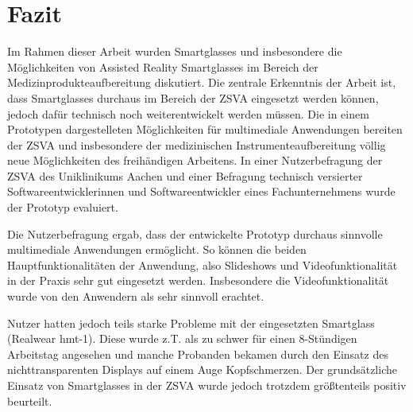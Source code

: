 %
%
%
%
%
%
\chapter{Fazit}
\label{ch:Fazit}

Im Rahmen dieser Arbeit wurden Smartglasses und insbesondere die Möglichkeiten von Assisted Reality Smartglasses im Bereich der Medizinprodukteaufbereitung diskutiert. Die zentrale Erkenntnis der Arbeit ist, dass Smartglasses durchaus im Bereich der ZSVA eingesetzt werden können, jedoch dafür technisch noch weiterentwickelt werden müssen. Die in einem Prototypen dargestelleten Möglichkeiten für multimediale Anwendungen bereiten der ZSVA und insbesondere der medizinischen Instrumenteaufbereitung völlig neue Möglichkeiten des freihändigen Arbeitens. In einer Nutzerbefragung der ZSVA des Uniklinikums Aachen und einer Befragung technisch versierter  Softwareentwicklerinnen und Softwareentwickler eines Fachunternehmens wurde der Prototyp evaluiert.

Die Nutzerbefragung ergab, dass der entwickelte Prototyp durchaus sinnvolle multimediale Anwendungen ermöglicht. So können die beiden Hauptfunktionalitäten der Anwendung, also Slideshows und Videofunktionalität in der Praxis sehr gut eingesetzt werden. Insbesondere die Videofunktionalität wurde von den Anwendern als sehr sinnvoll erachtet. 

Nutzer hatten jedoch teils starke Probleme mit der eingesetzten Smartglass (Realwear hmt-1). Diese wurde z.T. als zu schwer für einen 8-Stündigen Arbeitstag angesehen und manche Probanden bekamen durch den Einsatz des nichttransparenten Displays auf einem Auge Kopfschmerzen. Der grundsätzliche Einsatz von Smartglasses in der ZSVA wurde jedoch trotzdem größtenteils positiv beurteilt.
%
